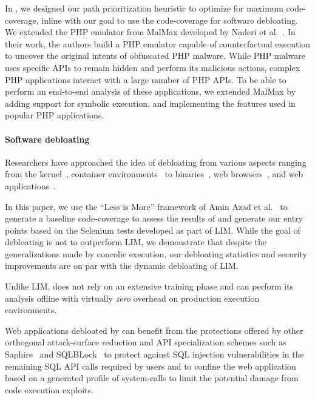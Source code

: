 In \animatedead{}, we designed our path prioritization heuristic to optimize for maximum code-coverage, inline with our goal to use the code-coverage for software debloating. 
We extended the PHP emulator from MalMax developed by Naderi et al.~\cite{naderi2019malmax,naderi2019cubismo}. 
In their work, the authors build a PHP emulator capable of counterfactual execution to uncover the original intents of obfuscated PHP malware. 
While PHP malware uses specific APIs to remain hidden and perform its malicious actions, complex PHP applications interact with a large number of PHP APIs. 
To be able to perform an end-to-end analysis of these applications, we extended MalMax by adding support for symbolic execution, and implementing the features used in popular PHP applications. 

\paragraph{Software debloating} 
Researchers have approached the idea of debloating from various aspects ranging from the kernel~\cite{abubakar2021shard}, container environments~\cite{rastogi2017cimplifier, 259711} to binaries~\cite{hasan2022decap, redini2019b, heo2018effective, ghavamnia2020temporal, mishra2020saffire, koo2019configuration, quach2018debloating}, web browsers~\cite{snyder2017most, qian2020slimium}, and web applications~\cite{azad2019less, bulekov2021saphire, mininode, jahanshahi2020you}.

In this paper, we use the ``Less is More'' framework of Amin Azad et al.~\cite{azad2019less} to generate a baseline code-coverage to assess the results of \animatedead{} and generate our entry points based on the Selenium tests developed as part of LIM. 
While the goal of \animatedead{} debloating is not to outperform LIM, we demonstrate that despite the generalizations made by concolic execution, our debloating statistics and security improvements are on par with the dynamic debloating of LIM. 

Unlike LIM, \animatedead{} does not rely on an extensive training phase and can perform its analysis offline with virtually \emph{zero} overhead on production execution environments. 

Web applications debloated by \animatedead{} can benefit from the protections offered by other orthogonal attack-surface reduction and API specialization schemes such as Saphire~\cite{bulekov2021saphire} and SQLBLock~\cite{jahanshahi2020you} to protect against SQL injection vulnerabilities in the remaining SQL API calls required by users and to confine the web application based on a generated profile of system-calls to limit the potential damage from code execution exploits.


